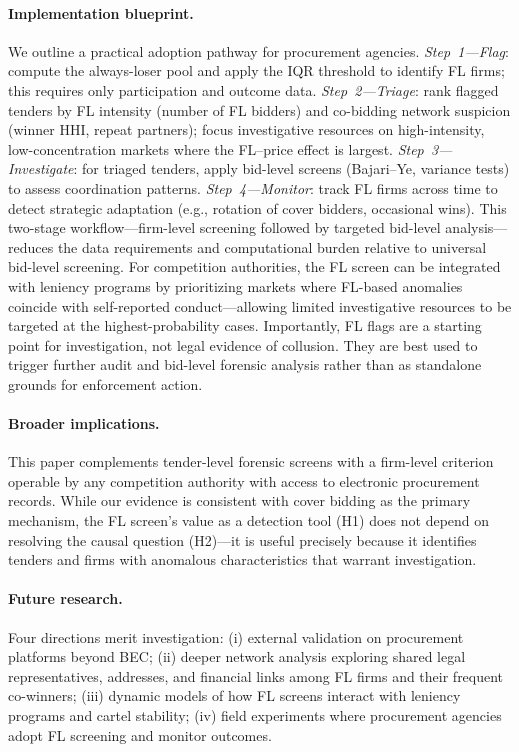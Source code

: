 \paragraph{Implementation blueprint.}
We outline a practical adoption pathway for procurement agencies.
\emph{Step~1---Flag}: compute the always-loser pool and apply the IQR
threshold to identify FL firms; this requires only participation and
outcome data. \emph{Step~2---Triage}: rank flagged tenders by FL
intensity (number of FL bidders) and co-bidding network suspicion
(winner HHI, repeat partners); focus investigative resources on
high-intensity, low-concentration markets where the FL--price effect is
largest. \emph{Step~3---Investigate}: for triaged tenders, apply
bid-level screens (Bajari--Ye, variance tests) to assess coordination
patterns. \emph{Step~4---Monitor}: track FL firms across time to detect
strategic adaptation (e.g., rotation of cover bidders, occasional
wins). This two-stage workflow---firm-level screening followed by
targeted bid-level analysis---reduces the data requirements and
computational burden relative to universal bid-level screening.
For competition authorities, the FL screen can be integrated with
leniency programs by prioritizing markets where FL-based anomalies
coincide with self-reported conduct---allowing limited investigative
resources to be targeted at the highest-probability cases. Importantly,
FL flags are a starting point for investigation, not legal evidence of
collusion. They are best used to trigger further audit and bid-level
forensic analysis rather than as standalone grounds for enforcement
action.

\paragraph{Broader implications.} %
This paper complements tender-level forensic screens with a firm-level
criterion operable by any competition authority with access to electronic
procurement records. While our evidence is consistent with cover bidding
as the primary mechanism, the FL screen's value as a detection tool (H1)
does not depend on resolving the causal question (H2)---it is useful
precisely because it identifies tenders and firms with anomalous
characteristics that warrant investigation.

\paragraph{Future research.}
Four directions merit investigation: (i) external validation on
procurement platforms beyond BEC; (ii) deeper network analysis exploring
shared legal representatives, addresses, and financial links among FL
firms and their frequent co-winners; (iii) dynamic models of how FL
screens interact with leniency programs and cartel stability; (iv)
field experiments where procurement agencies adopt FL screening and
monitor outcomes.

